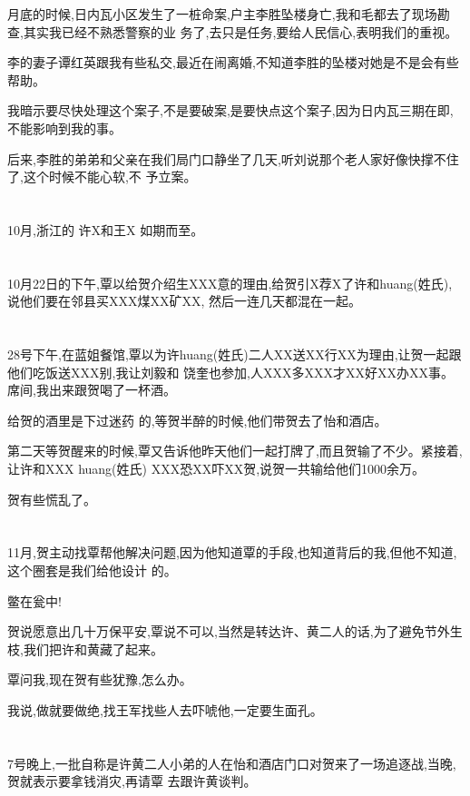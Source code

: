 \documentclass[11pt]{article}
\begin{document}
月底的时候,日内瓦小区发生了一桩命案,户主李胜坠楼身亡,我和毛都去了现场勘查,其实我已经不熟悉警察的业
务了,去只是任务,要给人民信心,表明我们的重视。

李的妻子谭红英跟我有些私交,最近在闹离婚,不知道李胜的坠楼对她是不是会有些帮助。

我暗示要尽快处理这个案子,不是要破案,是要快点这个案子,因为日内瓦三期在即,不能影响到我的事。

后来,李胜的弟弟和父亲在我们局门口静坐了几天,听刘说那个老人家好像快撑不住了,这个时候不能心软,不
予立案。

\section{}
10月,浙江的 许X和王X 如期而至。

\section{}
10月22日的下午,覃以给贺介绍生XXX意的理由,给贺引X荐X了许和huang(姓氏),说他们要在邻县买XXX煤XX矿XX,
然后一连几天都混在一起。

\section{}
28号下午,在蓝姐餐馆,覃以为许huang(姓氏)二人XX送XX行XX为理由,让贺一起跟他们吃饭送XXX别,我让刘毅和
饶奎也参加,人XXX多XXX才XX好XX办XX事。席间,我出来跟贺喝了一杯酒。

给贺的酒里是下过迷药 的,等贺半醉的时候,他们带贺去了怡和酒店。

第二天等贺醒来的时候,覃又告诉他昨天他们一起打牌了,而且贺输了不少。紧接着,让许和XXX huang(姓氏)
XXX恐XX吓XX贺,说贺一共输给他们1000余万。

贺有些慌乱了。

\section{}
11月,贺主动找覃帮他解决问题,因为他知道覃的手段,也知道背后的我,但他不知道,这个圈套是我们给他设计
的。

鳖在瓮中!

贺说愿意出几十万保平安,覃说不可以,当然是转达许、黄二人的话,为了避免节外生枝,我们把许和黄藏了起来。

覃问我,现在贺有些犹豫,怎么办。

我说,做就要做绝,找王军找些人去吓唬他,一定要生面孔。

\section{}
7号晚上,一批自称是许黄二人小弟的人在怡和酒店门口对贺来了一场追逐战,当晚,贺就表示要拿钱消灾,再请覃
去跟许黄谈判。
\end{document}
